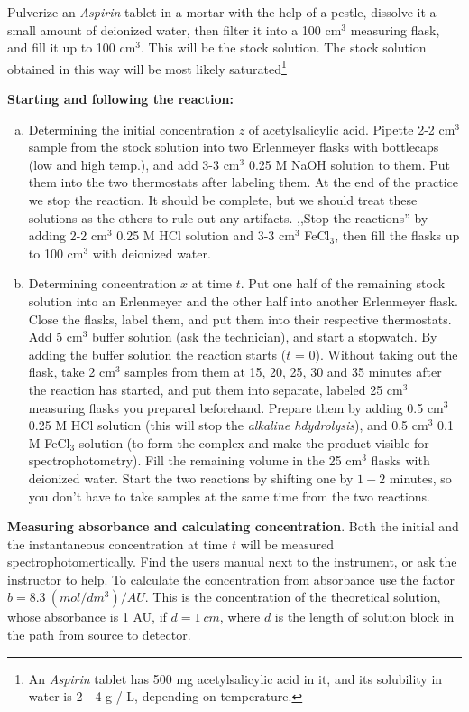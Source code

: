 Pulverize an \emph{Aspirin} tablet in a mortar with the help of a pestle, dissolve it a small amount of deionized water, then filter it into a 100 cm$^3$ measuring flask, and fill it up to 100 cm$^3$. This will be the stock solution. The stock solution obtained in this way will be most likely saturated\footnote{An \emph{Aspirin} tablet has 500 mg acetylsalicylic acid in it, and its solubility in water is 2 - 4 g / L, depending on temperature.}

\textbf{Starting and following the reaction:}

\begin{enumerate}[(a)]
\item Determining the initial concentration $z$ of acetylsalicylic acid. Pipette 2-2 cm$^3$ sample from the stock solution into two Erlenmeyer flasks with bottlecaps (low and high temp.), and add 3-3 cm$^3$ 0.25 M NaOH solution to them. Put them into the two thermostats after labeling them. At the end of the practice we stop the reaction. It should be complete, but we should treat these solutions as the others to rule out any artifacts. ,,Stop the reactions'' by adding 2-2 cm$^3$ 0.25 M HCl solution and 3-3 cm$^3$ FeCl$_3$, then fill the flasks up to 100 cm$^3$ with deionized water.

\item Determining concentration $x$ at time $t$. Put one half of the remaining stock solution into an Erlenmeyer and the other half into another Erlenmeyer flask. Close the flasks, label them, and put them into their respective thermostats. Add 5 cm$^3$ buffer solution (ask the technician), and start a stopwatch. By adding the buffer solution the reaction starts ($t$ = 0). Without taking out the flask, take 2 cm$^3$ samples from them at 15, 20, 25, 30 and 35 minutes after the reaction has started, and put them into separate, labeled 25 cm$^3$ measuring flasks you prepared beforehand. Prepare them by adding 0.5 cm$^3$ 0.25 M HCl solution (this will stop the \emph{alkaline hdydrolysis}), and 0.5 cm$^3$ 0.1 M FeCl$_3$ solution (to form the complex and make the product visible for spectrophotometry). Fill the remaining volume in the 25 cm$^3$ flasks with deionized water. Start the two reactions by shifting one by $1 - 2$ minutes, so you don't have to take samples at the same time from the two reactions.
\end{enumerate}

\textbf{Measuring absorbance and calculating concentration}. Both the initial and the instantaneous concentration at time $t$ will be measured spectrophotomertically. Find the users manual next to the instrument, or ask the instructor to help. To calculate the concentration from absorbance use the factor $b = 8.3~(mol/dm^3) / AU$. This is the concentration of the theoretical solution, whose absorbance is 1 AU, if $d = 1~cm$, where $d$ is the length of solution block in the path from source to detector.

